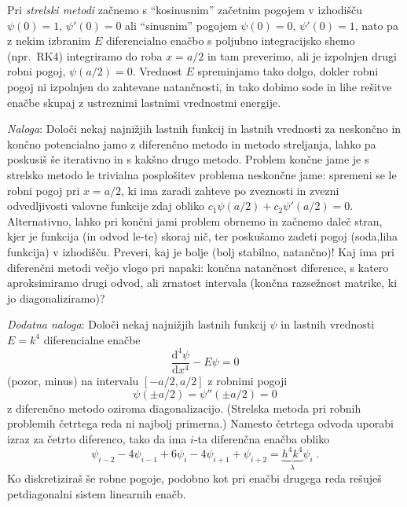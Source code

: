 \documentclass[slovene,11pt,a4paper]{article}
\newcommand{\ddd}{\mathrm{d}}
\newcommand{\Dd}[3][{}]{\frac{\ddd^{#1} #2}{\ddd #3^{#1}}}
\begin{document}
\smallskip

Pri {\sl strelski metodi\/} začnemo s ``kosinusnim'' začetnim pogojem
v izhodišču $\psi(0)=1$, $\psi'(0)=0$ ali ``sinusnim'' pogojem
$\psi(0)=0$, $\psi'(0)=1$, nato pa z nekim izbranim $E$ diferencialno
enačbo s poljubno integracijsko shemo (npr.~RK4) integriramo do roba
$x=a/2$ in tam preverimo, ali je izpolnjen drugi robni pogoj, $\psi(a/2)=0$.
Vrednost $E$ spreminjamo tako dolgo, dokler robni pogoj ni izpolnjen do
zahtevane natančnosti, in tako dobimo sode in lihe rešitve enačbe
skupaj z ustreznimi lastnimi vrednostmi energije.

\medskip

{\it Naloga\/}: Določi nekaj najnižjih lastnih funkcij in lastnih
vrednosti za
neskončno in končno potencialno jamo z diferenčno metodo in metodo streljanja, lahko pa poskusiš še iterativno in  s kakšno drugo metodo. 
Problem končne jame je s strelsko metodo le trivialna posplošitev
problema neskončne jame: spremeni se le robni pogoj pri $x=a/2$,
ki ima zaradi zahteve po zveznosti in zvezni odvedljivosti valovne
funkcije zdaj obliko $c_1\psi(a/2) + c_2\psi'(a/2) = 0$. 
Alternativno, lahko pri končni jami problem obrnemo in začnemo daleč stran, kjer je funkcija 
(in odvod le-te) skoraj nič, ter poskušamo zadeti  pogoj (soda,liha funkcija) v izhodišču. Preveri,
kaj je bolje (bolj stabilno, natančno)!
Kaj ima pri diferenčni metodi večjo vlogo pri napaki:
končna natančnost diference, s katero aproksimiramo drugi odvod,
ali zrnatost intervala (končna razsežnost matrike, ki jo
diagonaliziramo)?

\bigskip

{\it Dodatna naloga\/}: Določi nekaj najnižjih lastnih funkcij $\psi$
in lastnih vrednosti $E=k^4$ diferencialne enačbe
\begin{equation*}
\Dd[4]{\psi}{x} - E\psi = 0
\end{equation*}
(pozor, minus) na intervalu $[-a/2,a/2]$ z robnimi pogoji
\begin{equation*}
\psi(\pm a/2) = \psi''(\pm a/2) = 0
\end{equation*}
z diferenčno metodo oziroma diagonalizacijo.  (Strelska metoda
pri robnih problemih četrtega reda ni najbolj primerna.)
Namesto četrtega odvoda uporabi izraz za četrto diferenco,
tako da ima $i$-ta diferenčna enačba obliko
\begin{equation*}
\psi_{i-2} - 4\psi_{i-1} + 6\psi_i - 4\psi_{i+1} + \psi_{i+2}
= \underbrace{h^4k^4}_\lambda \psi_i \>.  
\end{equation*}
Ko diskretiziraš še robne pogoje, podobno kot pri enačbi
drugega reda rešuješ petdiagonalni sistem linearnih enačb.

\end{document}
